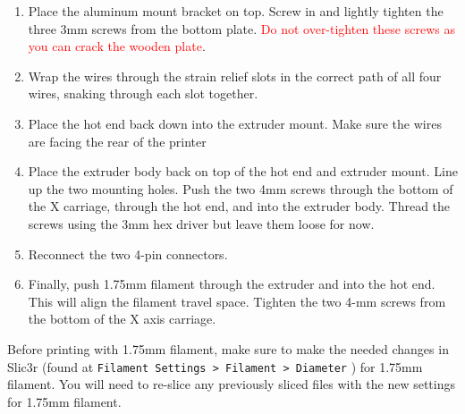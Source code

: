 \begin{enumerate}
\item Place the aluminum mount bracket on top. Screw in and lightly tighten the three 3mm screws from the bottom plate. \textcolor{red}{Do not over-tighten these screws as you can crack the wooden plate}.
\item Wrap the wires through the strain relief slots in the correct path of all four wires, snaking through each slot together.
\item Place the hot end back down into the extruder mount. Make sure the wires are facing the rear of the printer
\item Place the extruder body back on top of the hot end and extruder mount. Line up the two mounting holes. Push the two 4mm screws through the bottom of the X carriage, through the hot end, and into the extruder body. Thread the screws using the 3mm hex driver but leave them loose for now.
\item Reconnect the two 4-pin connectors.
\item Finally, push 1.75mm filament through the extruder and into the hot end. This will align the filament travel space. Tighten the two 4-mm screws from the bottom of the X axis carriage.
\end{enumerate}

Before printing with 1.75mm filament, make sure to make the needed changes in Slic3r (found at \texttt{Filament Settings > Filament > Diameter}  ) for 1.75mm filament. You will need to re-slice any previously sliced files with the new settings for 1.75mm filament.
